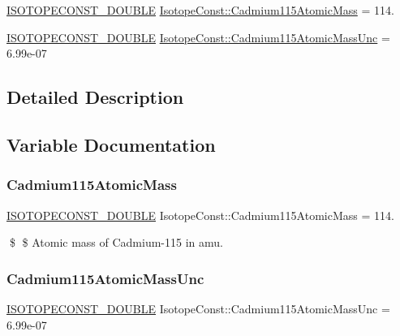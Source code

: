 \begin{DoxyCompactItemize}
\item 
\mbox{\hyperlink{group___isotope_const-_macros_ga8f45a7272ce02c0b4c65c44636ed719a}{I\+S\+O\+T\+O\+P\+E\+C\+O\+N\+S\+T\+\_\+\+D\+O\+U\+B\+LE}} \mbox{\hyperlink{group___isotope_const-_cadmium-_cd115_ga7f46fad845c5daacdfa11ff2f01bb4ad}{Isotope\+Const\+::\+Cadmium115\+Atomic\+Mass}} = 114.
\item 
\mbox{\hyperlink{group___isotope_const-_macros_ga8f45a7272ce02c0b4c65c44636ed719a}{I\+S\+O\+T\+O\+P\+E\+C\+O\+N\+S\+T\+\_\+\+D\+O\+U\+B\+LE}} \mbox{\hyperlink{group___isotope_const-_cadmium-_cd115_ga397c428152990a7c86619e2ac44f299b}{Isotope\+Const\+::\+Cadmium115\+Atomic\+Mass\+Unc}} = 6.\+99e-\/07
\end{DoxyCompactItemize}


\subsection{Detailed Description}


\subsection{Variable Documentation}
\mbox{\label{group___isotope_const-_cadmium-_cd115_ga7f46fad845c5daacdfa11ff2f01bb4ad}} 
\subsubsection{\texorpdfstring{Cadmium115\+Atomic\+Mass}{Cadmium115AtomicMass}}
{\footnotesize\ttfamily \mbox{\hyperlink{group___isotope_const-_macros_ga8f45a7272ce02c0b4c65c44636ed719a}{I\+S\+O\+T\+O\+P\+E\+C\+O\+N\+S\+T\+\_\+\+D\+O\+U\+B\+LE}} Isotope\+Const\+::\+Cadmium115\+Atomic\+Mass = 114.}

\$ \$ Atomic mass of Cadmium-\/115 in amu. \mbox{\label{group___isotope_const-_cadmium-_cd115_ga397c428152990a7c86619e2ac44f299b}} 
\subsubsection{\texorpdfstring{Cadmium115\+Atomic\+Mass\+Unc}{Cadmium115AtomicMassUnc}}
{\footnotesize\ttfamily \mbox{\hyperlink{group___isotope_const-_macros_ga8f45a7272ce02c0b4c65c44636ed719a}{I\+S\+O\+T\+O\+P\+E\+C\+O\+N\+S\+T\+\_\+\+D\+O\+U\+B\+LE}} Isotope\+Const\+::\+Cadmium115\+Atomic\+Mass\+Unc = 6.\+99e-\/07}


